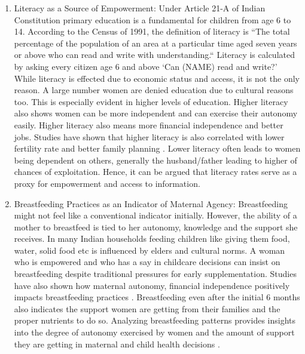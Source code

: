 \begin{sloppypar}
\begin{enumerate}
\item Literacy as a Source of Empowerment:
 Under Article 21-A of Indian Constitution primary education is a fundamental for children from age 6 to 14. According to the Census of 1991, the definition of literacy is ``The total percentage of the population of an area at a particular time aged seven years or above who can read and write with understanding.`` Literacy is calculated by asking every citizen  age 6 and above `Can (NAME) read and write?' While literacy is effected due to economic status and access, it is not the only reason.  A large number women are denied education due to cultural reasons too. This is especially evident in higher levels of education. Higher literacy also shows women can be more independent and can exercise their autonomy easily. Higher literacy also means more financial independence and better jobs. Studies have shown that higher literacy is also correlated with lower fertility rate and better family planning \citep{kumar2022measuring}. Lower literacy often leads to women being dependent on others, generally the husband/father leading to higher of chances of exploitation. Hence, it can be argued that literacy rates serve as a proxy for  empowerment and access to information. 

\item  Breastfeeding Practices as an Indicator of Maternal Agency: Breastfeeding might not feel like a conventional indicator initially. However, the ability of a mother to breastfeed  is  tied to her autonomy, knowledge and the support she receives. In many Indian households feeding children like giving them food, water, solid food etc is influenced by elders and cultural norms. A woman who is empowered and who has a say in childcare decisions can insist on  breastfeeding despite traditional pressures for early supplementation. Studies have also shown how maternal autonomy, financial independence positively impacts breastfeeding practices \citep{shroff2011does}. Breastfeeding even after the initial 6 months also indicates the support women are getting from their families and the proper nutrients to do so. Analyzing breastfeeding patterns provides insights into the degree of autonomy exercised by women and the amount of support they are getting  in maternal and child health decisions \citep{Delawarde-Saïas2024}. 
\end{enumerate}
\end{sloppypar}
